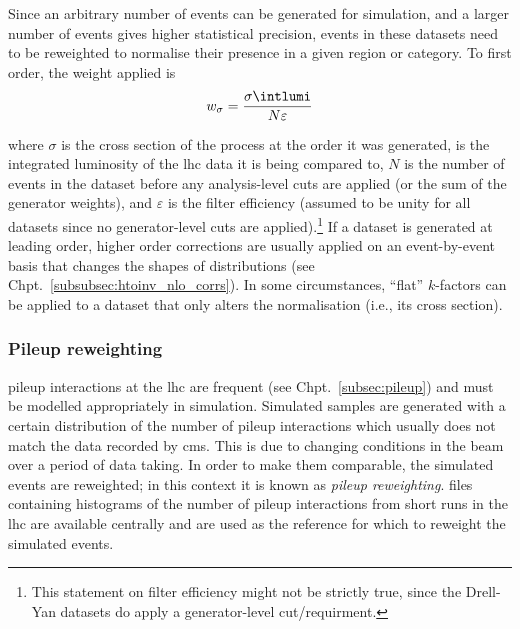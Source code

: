 Since an arbitrary number of events can be generated for simulation, and a larger number of events gives higher statistical precision, events in these datasets need to be reweighted to normalise their presence in a given region or category. To first order, the weight applied is
\begin{equation}
    w_{\sigma} = \frac{ \sigma \intlumi }{ N \varepsilon }
    \label{eq:xs_weight}
\end{equation}

where $\sigma$ is the cross section of the process at the order it was generated, \intlumi is the integrated luminosity of the \acrshort{lhc} data it is being compared to, $N$ is the number of events in the dataset before any analysis-level cuts are applied (or the sum of the generator weights), and $\varepsilon$ is the filter efficiency (assumed to be unity for all datasets since no generator-level cuts are applied).\footnote{This statement on filter efficiency might not be strictly true, since the Drell-Yan datasets do apply a generator-level cut/requirment.} If a dataset is generated at leading order, higher order corrections are usually applied on an event-by-event basis that changes the shapes of distributions (see Chpt.~\ref{subsubsec:htoinv_nlo_corrs}). In some circumstances, ``flat'' $k$-factors can be applied to a dataset that only alters the normalisation (i.e., its cross section).




\subsubsection{Pileup reweighting}
\label{subsubsec:pu_reweighting}

\Gls{pileup} interactions at the \acrshort{lhc} are frequent (see Chpt.~\ref{subsec:pileup}) and must be modelled appropriately in simulation. Simulated samples are generated with a certain distribution of the number of \gls{pileup} interactions which usually does not match the data recorded by \acrshort{cms}. This is due to changing conditions in the beam over a period of data taking. In order to make them comparable, the simulated events are reweighted; in this context it is known as \emph{\gls{pileup} reweighting}. \ROOT files containing histograms of the number of \gls{pileup} interactions from short runs in the \acrshort{lhc} are available centrally and are used as the reference for which to reweight the simulated events.

